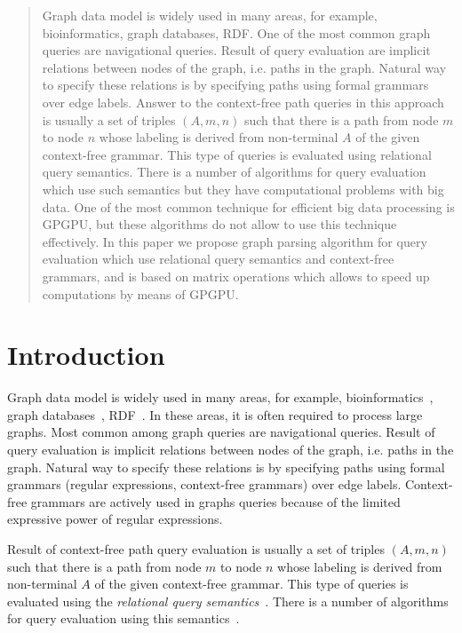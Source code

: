 \documentclass{vldb}
\begin{document}
\begin{abstract}
Graph data model is widely used in many areas, for example, bioinformatics, graph databases, RDF. One of the most common graph queries are navigational queries. Result of query evaluation are implicit relations between nodes of the graph, i.e. paths in the graph. Natural way to specify these relations is by specifying paths using formal grammars over edge labels. Answer to the context-free path queries in this approach is usually a set of triples $(A, m, n)$ such that there is a path from node $m$ to node $n$ whose labeling is derived from non-terminal $A$ of the given context-free grammar. This type of queries is evaluated using relational query semantics. There is a number of algorithms for query evaluation which use such semantics but they have computational problems with big data. One of the most common technique for efficient big data processing is GPGPU, but these algorithms do not allow to use this technique effectively. In this paper we propose graph parsing algorithm for query evaluation which use relational query semantics and context-free grammars, and is based on matrix operations which allows to speed up computations by means of GPGPU.
\end{abstract}

\section{Introduction}
Graph data model is widely used in many areas, for example, bioinformatics~\cite{Bio}, graph databases~\cite{graphDB}, RDF~\cite{RDF}. In these areas, it is often required to process large graphs. Most common among graph queries are navigational queries. Result of query evaluation is implicit relations between nodes of the graph, i.e. paths in the graph. Natural way to specify these relations is by specifying paths using formal grammars (regular expressions, context-free grammars) over edge labels. Context-free grammars are actively used in graphs queries because of the limited expressive power of regular expressions. 

Result of context-free path query evaluation is usually a set of triples $(A, m, n)$ such that there is a path from node $m$ to node $n$ whose labeling is derived from non-terminal $A$ of the given context-free grammar. This type of queries is evaluated using the \textit{relational query semantics}~\cite{hellingsRelational}. There is a number of algorithms for query evaluation using this semantics~\cite{GLL, hellingsRelational, RDF}.
\end{document}

